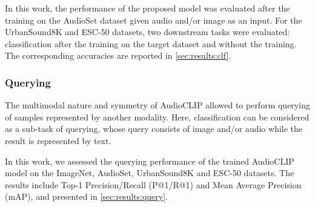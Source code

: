 \documentclass[runningheads]{llncs}
\begin{document}
In this work, the performance of the proposed model was evaluated after the training on the \mbox{AudioSet} dataset given audio and/or image as an input.
For the \mbox{UrbanSound8K} and \mbox{ESC-50} datasets, two downstream tasks were evaluated: classification after the training on the target dataset and without the training.
The corresponding accuracies are reported in \autoref{sec:results:clf}.

\subsubsection{Querying} \label{sec:exp_setup:infer:query}

The multimodal nature and symmetry of \mbox{AudioCLIP} allowed to perform querying of samples represented by another modality.
Here, classification can be considered as a sub-task of querying, whose query consists of image and/or audio while the result is represented by text.

In this work, we assessed the querying performance of the trained \mbox{AudioCLIP} model on the \mbox{ImageNet}, \mbox{AudioSet}, \mbox{UrbanSound8K} and \mbox{ESC-50} datasets.
The results include Top-1 Precision/Recall (P@1/R@1) and Mean Average Precision (mAP), and presented in \autoref{sec:results:query}.
\end{document}
